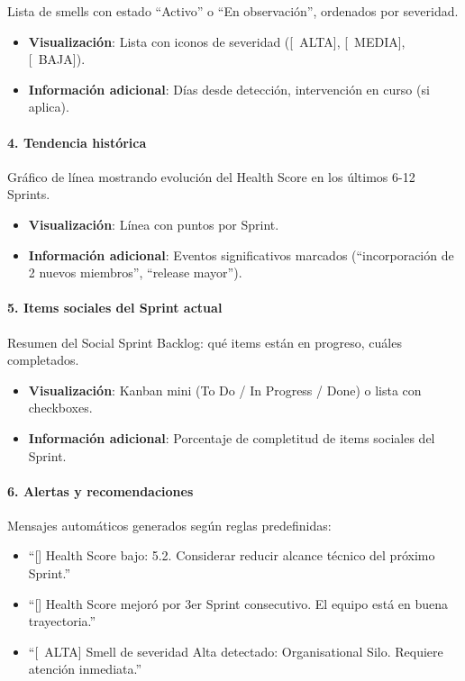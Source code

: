 Lista de smells con estado ``Activo'' o ``En observación'', ordenados por severidad.

\begin{itemize}
    \item \textbf{Visualización}: Lista con iconos de severidad ([\Alta\ ALTA], [\Media\ MEDIA], [\Baja\ BAJA]).
    \item \textbf{Información adicional}: Días desde detección, intervención en curso (si aplica).
\end{itemize}

\paragraph{4. Tendencia histórica}

Gráfico de línea mostrando evolución del Health Score en los últimos 6-12 Sprints.

\begin{itemize}
    \item \textbf{Visualización}: Línea con puntos por Sprint.
    \item \textbf{Información adicional}: Eventos significativos marcados (``incorporación de 2 nuevos miembros'', ``release mayor'').
\end{itemize}

\paragraph{5. Items sociales del Sprint actual}

Resumen del Social Sprint Backlog: qué items están en progreso, cuáles completados.

\begin{itemize}
    \item \textbf{Visualización}: Kanban mini (To Do / In Progress / Done) o lista con checkboxes.
    \item \textbf{Información adicional}: Porcentaje de completitud de items sociales del Sprint.
\end{itemize}

\paragraph{6. Alertas y recomendaciones}

Mensajes automáticos generados según reglas predefinidas:

\begin{itemize}
    \item ``[\Alerta] Health Score bajo: 5.2. Considerar reducir alcance técnico del próximo Sprint.''
    \item ``[] Health Score mejoró por 3er Sprint consecutivo. El equipo está en buena trayectoria.''
    \item ``[\Alta\ ALTA] Smell de severidad Alta detectado: Organisational Silo. Requiere atención inmediata.''
\end{itemize}

